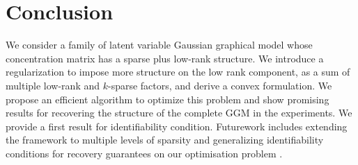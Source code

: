 \documentclass[letterpaper]{article}
\begin{document}
\section{Conclusion}
We consider a family of latent variable Gaussian graphical model whose concentration matrix has a sparse plus low-rank structure. We introduce a regularization to impose more structure on the low rank component, as a sum of multiple low-rank and $k$-sparse factors, and derive a convex formulation. We propose an efficient algorithm to optimize this problem and show promising results for recovering the structure of the complete GGM in the experiments. We provide a first result for identifiability condition. Futurework includes extending the framework to multiple levels of sparsity and generalizing identifiability conditions for recovery guarantees on our optimisation problem .



\end{document}
